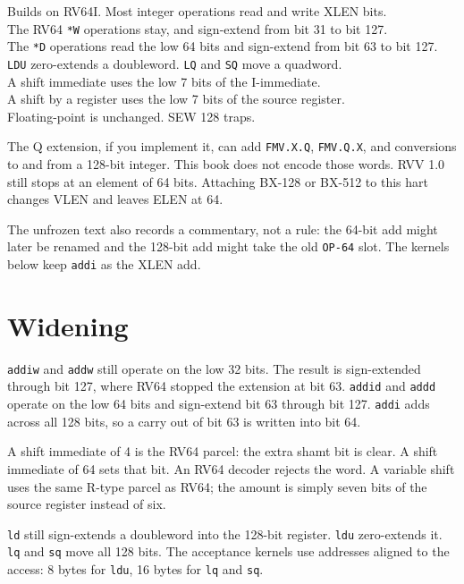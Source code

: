 \begin{spec}
Builds on RV64I. Most integer operations read and write XLEN bits.\\
The RV64 \texttt{*W} operations stay, and sign-extend from bit 31 to bit 127.\\
The \texttt{*D} operations read the low 64 bits and sign-extend from bit 63 to bit 127.\\
\texttt{LDU} zero-extends a doubleword. \texttt{LQ} and \texttt{SQ} move a quadword.\\
A shift immediate uses the low 7 bits of the I-immediate.\\
A shift by a register uses the low 7 bits of the source register.\\
Floating-point is unchanged. SEW 128 traps.
\end{spec}

The Q extension, if you implement it, can add \texttt{FMV.X.Q}, \texttt{FMV.Q.X}, and conversions to and from a 128-bit integer. This book does not encode those words. RVV 1.0 still stops at an element of 64 bits. Attaching BX-128 or BX-512 to this hart changes VLEN and leaves ELEN at 64.

The unfrozen text also records a commentary, not a rule: the 64-bit add might later be renamed and the 128-bit add might take the old \texttt{OP-64} slot. The kernels below keep \texttt{addi} as the XLEN add.

\section{Widening}

\texttt{addiw} and \texttt{addw} still operate on the low 32 bits. The result is sign-extended through bit 127, where RV64 stopped the extension at bit 63. \texttt{addid} and \texttt{addd} operate on the low 64 bits and sign-extend bit 63 through bit 127. \texttt{addi} adds across all 128 bits, so a carry out of bit 63 is written into bit 64.

A shift immediate of 4 is the RV64 parcel: the extra shamt bit is clear. A shift immediate of 64 sets that bit. An RV64 decoder rejects the word. A variable shift uses the same R-type parcel as RV64; the amount is simply seven bits of the source register instead of six.

\texttt{ld} still sign-extends a doubleword into the 128-bit register. \texttt{ldu} zero-extends it. \texttt{lq} and \texttt{sq} move all 128 bits. The acceptance kernels use addresses aligned to the access: 8 bytes for \texttt{ldu}, 16 bytes for \texttt{lq} and \texttt{sq}.

